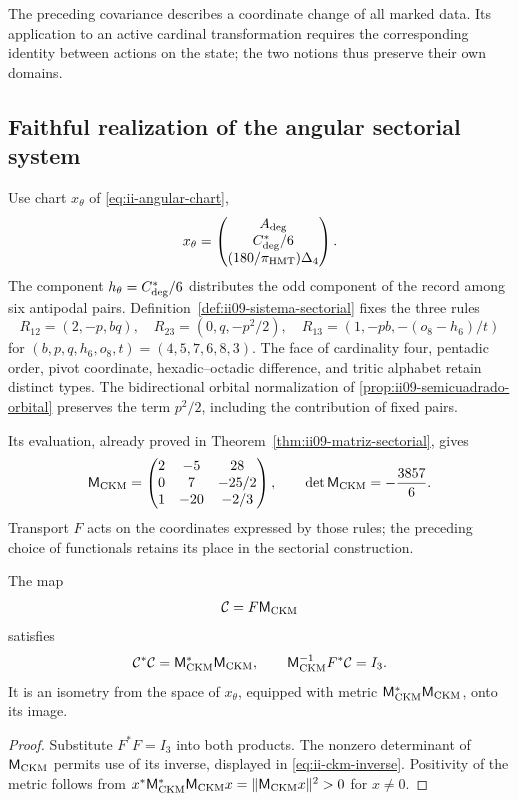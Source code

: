 The preceding covariance describes a coordinate change of all
marked data. Its application to an active cardinal transformation requires
the corresponding identity between actions on the state; the two
notions thus preserve their own domains.

\subsection{Faithful realization of the angular sectorial system}

Use chart \(x_\theta\) of
\eqref{eq:ii-angular-chart},
\[
 x_\theta=\begin{pmatrix}A_{\rm deg}\\C^*_{\rm deg}/6\\
                              (180/\pi_{\rm HMT})\Delta_4\end{pmatrix}.
\]
The component \(h_\theta=C^*_{\rm deg}/6\) distributes the odd
component of the record among six antipodal pairs.
Definition~\ref{def:ii09-sistema-sectorial} fixes the three rules
\[
 R_{12}=(2,-p,bq),\quad R_{23}=(0,q,-p^2/2),\quad
 R_{13}=(1,-pb,-(o_8-h_6)/t)
\]
for \((b,p,q,h_6,o_8,t)=(4,5,7,6,8,3)\). The face of cardinality
four, pentadic order, pivot coordinate, hexadic--octadic
difference, and tritic alphabet retain distinct types.
The bidirectional orbital normalization of
\ref{prop:ii09-semicuadrado-orbital} preserves the term \(p^2/2\),
including the contribution of fixed pairs.

Its evaluation, already proved in
Theorem~\ref{thm:ii09-matriz-sectorial}, gives
\[
 \mathsf M_{\rm CKM}=
 \begin{pmatrix}2&-5&28\\0&7&-25/2\\1&-20&-2/3\end{pmatrix},
 \qquad\det\mathsf M_{\rm CKM}=-\frac{3857}{6}.
\]
Transport \(F\) acts on the coordinates expressed by those
rules; the preceding choice of functionals retains its place in the
sectorial construction.

\begin{corollary}
\label{cor:ii-witt-composed-reader}
The map
\begin{equation}
 \mathcal C=F\mathsf M_{\rm CKM}
 \label{eq:ii-witt-composed-reader}
\end{equation}
satisfies
\[
 \mathcal C^*\mathcal C=\mathsf M_{\rm CKM}^*\mathsf M_{\rm CKM},
 \qquad
 \mathsf M_{\rm CKM}^{-1}F^*\mathcal C=I_3.
\]
It is an isometry from the space of \(x_\theta\), equipped with metric
\(\mathsf M_{\rm CKM}^*\mathsf M_{\rm CKM}\), onto its image.
\end{corollary}
\begin{proof}
Substitute \(F^*F=I_3\) into both products. The nonzero determinant
of \(\mathsf M_{\rm CKM}\) permits use of its inverse,
displayed in \eqref{eq:ii-ckm-inverse}. Positivity of the metric
follows from
\(x^*\mathsf M_{\rm CKM}^*\mathsf M_{\rm CKM}x
=\|\mathsf M_{\rm CKM}x\|^2>0\) for \(x\ne0\).
\end{proof}

